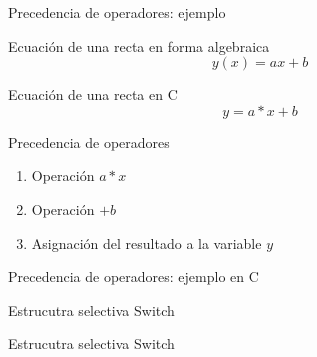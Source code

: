 \documentclass[xcolor=pdftex,table,11pt]{beamer}
\begin{document}
\begin{frame}{Precedencia de operadores: ejemplo}


 \begin{block}{Ecuación de una recta en forma algebraica}
\begin{equation}
y(x) = a x + b
\end{equation}
    \end{block}
    

 \begin{block}{Ecuación de una recta en C}
\begin{equation}
y = a * x + b
\end{equation}


  \end{block}

 \begin{block}{Precedencia de operadores}
 \begin{enumerate}
\item Operación $a * x$
\item Operación $+b$
\item Asignación del resultado a la variable $y$
\end{enumerate}
  \end{block}
\end{frame}
\begin{frame}{Precedencia de operadores: ejemplo en C}
\codesetstylefrombeamer
{}
\end{frame}

\begin{frame}{Estrucutra selectiva Switch}

 \begin{block}{Estrucutra selectiva Switch}
 \end{block}

\end{frame}
\end{document}
